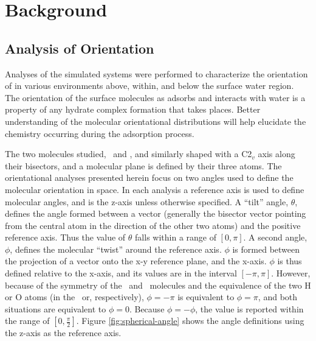 \section{Background}

\subsection{Analysis of Orientation}

	Analyses of the simulated systems were performed to characterize the orientation of \suldiox in various environments above, within, and below the surface water region. The orientation of the surface molecules as \suldiox adsorbs and interacts with water is a property of any hydrate complex formation that takes places. Better understanding of the molecular orientational distributions will help elucidate the chemistry occurring during the adsorption process.

	The two molecules studied, \wat~and \suldiox, and similarly shaped with a C2$_v$ axis along their bisectors, and a molecular plane is defined by their three atoms. The orientational analyses presented herein focus on two angles used to define the molecular orientation in space. In each analysis a reference axis is used to define molecular angles, and is the z-axis unless otherwise specified. A ``tilt'' angle, $\theta$, defines the angle formed between a vector (generally the bisector vector pointing from the central atom in the direction of the other two atoms) and the positive reference axis. Thus the value of $\theta$ falls within a range of $[0,\pi]$. A second angle, $\phi$, defines the molecular ``twist'' around the reference axis. $\phi$ is formed between the projection of a vector onto the x-y reference plane, and the x-axis. $\phi$ is thus defined relative to the x-axis, and its values are in the interval $[-\pi,\pi]$. However, because of the symmetry of the \wat~and \suldiox~molecules and the equivalence of the two H or O atoms (in the \wat~or\suldiox, respectively), $\phi=-\pi$ is equivalent to $\phi=\pi$, and both situations are equivalent to $\phi=0$. Because $\phi=-\phi$, the value is reported within the range of $[0,\frac \pi 2]$. Figure \ref{fig:spherical-angle} shows the angle definitions using the z-axis as the reference axis.

